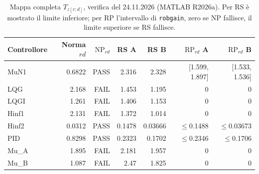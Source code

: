 \begin{table}[htbp]\centering\small
\setlength{\tabcolsep}{4pt}
\begin{tabular}{lrrrrrr}\toprule
Controllore & Norma $rd$ & $\mathrm{NP}_{rd}$ & RS A & RS B & $\mathrm{RP}_{rd}$ A & $\mathrm{RP}_{rd}$ B\\\midrule
MuN1 & \num{0.6822} & PASS & \num{2.316} & \num{2.328} & [\num{1.599}, \num{1.897}] & [\num{1.533}, \num{1.536}]\\
LQG & \num{2.168} & FAIL & \num{1.453} & \num{1.195} & 0 & 0\\
LQGI & \num{1.261} & FAIL & \num{1.406} & \num{1.153} & 0 & 0\\
Hinf1 & \num{2.131} & FAIL & \num{1.372} & \num{1.014} & 0 & 0\\
Hinf2 & \num{0.0312} & PASS & \num{0.1478} & \num{0.03666} & $\leq$\num{0.1488} & $\leq$\num{0.03673}\\
PID & \num{0.8298} & PASS & \num{0.2323} & \num{0.1702} & $\leq$\num{0.2346} & $\leq$\num{0.1706}\\
Mu\_A & \num{1.895} & FAIL & \num{2.181} & \num{1.957} & 0 & 0\\
Mu\_B & \num{1.087} & FAIL & \num{2.47} & \num{1.825} & 0 & 0\\
\bottomrule\end{tabular}
\caption{Mappa completa $T_{z[r;d]}$, verifica del 24.11.2026 (MATLAB R2026a). Per RS è mostrato il limite inferiore; per RP l'intervallo di \texttt{robgain}, zero se NP fallisce, il limite superiore se RS fallisce.}
\label{tab:cap9-mappa-completa}
\end{table}
